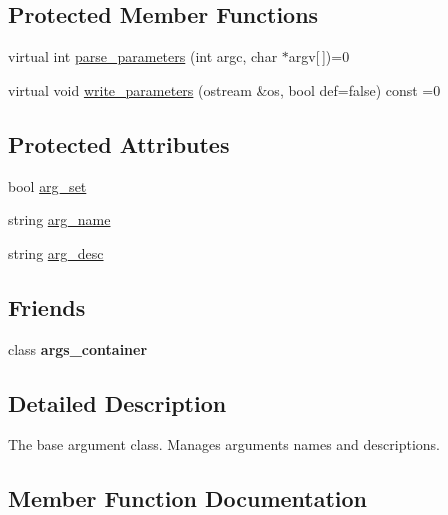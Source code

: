 \subsection*{Protected Member Functions}
\begin{DoxyCompactItemize}
\item 
virtual int \hyperlink{classclarg_1_1arg__base_a4c0e6afc44de0d825334a41d4ef5b813}{parse\+\_\+parameters} (int argc, char $\ast$argv\mbox{[}$\,$\mbox{]})=0
\item 
virtual void \hyperlink{classclarg_1_1arg__base_a476be3712ecd028fee248cef14cc3cfb}{write\+\_\+parameters} (ostream \&os, bool def=false) const =0
\end{DoxyCompactItemize}
\subsection*{Protected Attributes}
\begin{DoxyCompactItemize}
\item 
bool \hyperlink{classclarg_1_1arg__base_a897ba15feb1390687d072acae6c69512}{arg\+\_\+set}
\item 
string \hyperlink{classclarg_1_1arg__base_af0e1e1240bd9779d84d2b4d9f078f9e2}{arg\+\_\+name}
\item 
string \hyperlink{classclarg_1_1arg__base_adef436501e6af061da6e3b0652e43704}{arg\+\_\+desc}
\end{DoxyCompactItemize}
\subsection*{Friends}
\begin{DoxyCompactItemize}
\item 
class {\bfseries args\+\_\+container}\hypertarget{classclarg_1_1arg__base_a43417d1ca2f28ea0936749ee5fc8fab0}{}\label{classclarg_1_1arg__base_a43417d1ca2f28ea0936749ee5fc8fab0}

\end{DoxyCompactItemize}


\subsection{Detailed Description}
The base argument class. Manages arguments names and descriptions. 

\subsection{Member Function Documentation}

